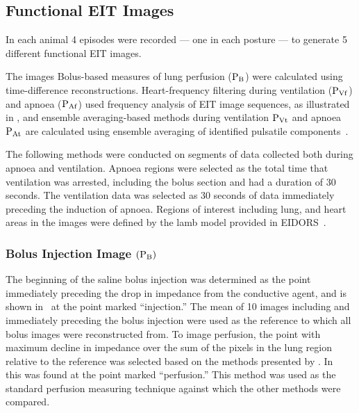 \subsection{Functional EIT Images}

In each animal 4 episodes were recorded --- one in each posture --- to generate 5
different functional EIT images. 

The images
Bolus-based measures of lung perfusion (${\rm P_{B}}$) were
calculated using time-difference
reconstructions. Heart-frequency filtering during ventilation (${\rm P_{Vf}}$) and
apnoea (${\rm P_{Af}}$) used
frequency analysis of EIT image sequences, as 
illustrated in , and ensemble averaging-based methods during ventilation
${\rm P_{Vt}}$ and apnoea ${\rm P_{At}}$ are 
calculated using ensemble averaging of identified pulsatile components~.

The following methods were conducted on segments of data collected both during apnoea and ventilation. 
Apnoea regions were selected as the total time that ventilation was arrested, including the bolus section
and had a duration of 30 seconds. The ventilation data was selected as 30 seconds of data immediately preceding the 
induction of apnoea.
Regions of interest including lung, and heart areas in the images were defined by the lamb model
provided in EIDORS~\parencite{adler_eidors_2017}.

\subsubsection{Bolus Injection Image $({\rm P_{B}})$}

The beginning of the saline bolus injection was determined as the point
immediately preceding the drop in impedance from the conductive agent, and is
shown in~ at the point marked ``injection.''
The mean of 10 images including and immediately preceding the bolus injection were used 
as the reference to which all bolus images were reconstructed from. 
To image perfusion, the point with maximum decline in impedance over 
the sum of the pixels in the lung region relative to the reference was selected based on the methods 
presented by .
In~ this was found at the point marked ``perfusion.'' 
This method was used as the standard perfusion 
measuring technique
against which the other methods were compared.

